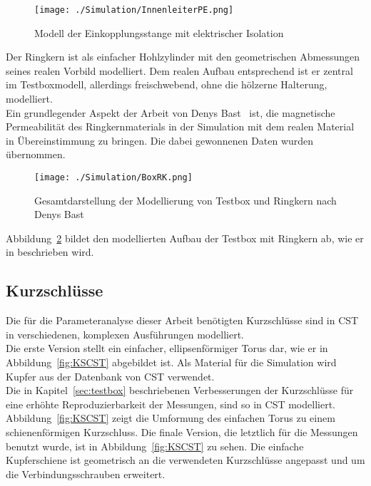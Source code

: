            \begin{figure}[htb]
                \centering
                \texttt{[image: ./Simulation/InnenleiterPE.png]}
                \caption{Modell der Einkopplungsstange mit elektrischer Isolation}
                \label{fig:InnenleiterCST}
            \end{figure}
        
        Der Ringkern ist als einfacher Hohlzylinder mit den geometrischen Abmessungen seines realen Vorbild modelliert. Dem realen Aufbau entsprechend ist er zentral im Testboxmodell, allerdings freischwebend, ohne die hölzerne Halterung, modelliert.\\
        Ein grundlegender Aspekt der Arbeit von Denys Bast~\citep{bast2017ba} ist, die magnetische Permeabilität des Ringkernmaterials in der Simulation mit dem realen Material in Übereinstimmung zu bringen. Die dabei gewonnenen Daten wurden übernommen.
        
            \begin{figure}[htb]
                \centering
                \texttt{[image: ./Simulation/BoxRK.png]}
                \caption{Gesamtdarstellung der Modellierung von Testbox und Ringkern nach Denys Bast~\citep{bast2017ba}}
                \label{fig:BoxRKCST}
            \end{figure}
        
        Abbildung~\ref{fig:BoxRKCST} bildet den modellierten Aufbau der Testbox mit Ringkern ab, wie er in \citep{bast2017ba} beschrieben wird.

        \subsection{Kurzschlüsse}
        Die für die Parameteranalyse dieser Arbeit benötigten Kurzschlüsse sind in CST in verschiedenen, komplexen Ausführungen modelliert.\\
        Die erste Version stellt ein einfacher, ellipsenförmiger Torus dar, wie er in Abbildung~\ref{fig:KSCST} abgebildet ist. Als Material für die Simulation wird Kupfer aus der Datenbank von CST verwendet.\\
        Die in Kapitel~\ref{sec:testbox} beschriebenen Verbesserungen der Kurzschlüsse für eine erhöhte Reproduzierbarkeit der Messungen, sind so in CST modelliert. Abbildung~\ref{fig:KSCST} zeigt die Umformung des einfachen Torus zu einem schienenförmigen Kurzschluss. Die finale Version, die letztlich für die Messungen benutzt wurde, ist in Abbildung~\ref{fig:KSCST} zu sehen. Die einfache Kupferschiene ist geometrisch an die verwendeten Kurzschlüsse angepasst und um die Verbindungsschrauben erweitert.
        
